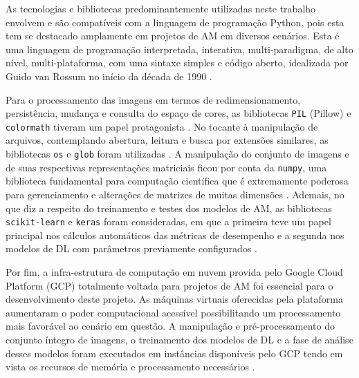 As tecnologias e bibliotecas predominantemente utilizadas neste trabalho envolvem e são compatíveis com a linguagem de programação Python, pois esta tem se destacado amplamente em projetos de AM em diversos cenários. Esta é uma linguagem de programação interpretada, interativa, multi-paradigma,  de alto nível, multi-plataforma, com uma sintaxe simples e código aberto, idealizada por Guido van Rossum no início da década de 1990 \cite{ref:python}.

Para o processamento das imagens em termos de redimensionamento, persistência, mudança e consulta do espaço de cores, as bibliotecas \texttt{PIL} (Pillow) e \texttt{colormath} tiveram um papel protagonista \cite{lib:pillow,lib:colormath}. No tocante à manipulação de arquivos, contemplando abertura, leitura e busca por extensões similares, as bibliotecas \texttt{os} e \texttt{glob} foram utilizadas \cite{lib:os,lib:glob}. A manipulação do conjunto de imagens e de suas respectivas representações matriciais ficou por conta da \texttt{numpy}, uma biblioteca fundamental para computação científica que é extremamente poderosa para gerenciamento e alterações de matrizes de muitas dimensões \cite{lib:numpy}.  Ademais, no que diz a respeito do treinamento e testes dos modelos de AM, as bibliotecas \texttt{scikit-learn} e \texttt{keras} foram consideradas, em que a primeira teve um papel principal nos cálculos automáticos das métricas de desempenho e a segunda nos modelos de DL com parâmetros previamente configurados \cite{lib:scikit,lib:keras}.

Por fim, a infra-estrutura de computação em nuvem provida pelo Google Cloud Platform (GCP) totalmente voltada para projetos de AM foi essencial para o desenvolvimento deste projeto. As máquinas virtuais oferecidas pela plataforma aumentaram o poder computacional acessível possibilitando um processamento mais favorável ao cenário em questão. A manipulação e pré-processamento do conjunto íntegro de imagens, o treinamento dos modelos de DL e a fase de análise desses modelos foram executados em instâncias disponíveis pelo GCP tendo em vista os recursos de memória e processamento necessários \cite{tec:gcloud}.

